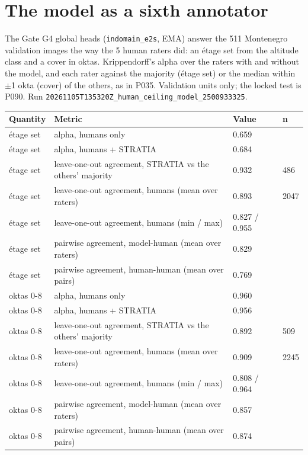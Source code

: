 \section{The model as a sixth annotator}

The Gate G4 global heads (\texttt{indomain\_\allowbreak{}e2s}, EMA) answer the 511 Montenegro validation images the way the 5 human raters did: an étage set from the altitude class and a cover in oktas. Krippendorff's alpha over the raters with and without the model, and each rater against the majority (étage set) or the median within $\pm$1 okta (cover) of the others, as in P035. Validation units only; the locked test is P090. Run \texttt{20261105T135320Z\_\allowbreak{}human\_\allowbreak{}ceiling\_\allowbreak{}model\_\allowbreak{}2500933325}.

\begin{center}{\scriptsize\setlength{\tabcolsep}{3pt}
\begin{tabular}{lp{13.5cm}ll}
\toprule
Quantity & Metric & Value & n \\
\midrule
étage set & alpha, humans only & 0.659 &  \\
étage set & alpha, humans + STRATIA & 0.684 &  \\
étage set & leave-one-out agreement, STRATIA vs the others' majority & 0.932 & 486 \\
étage set & leave-one-out agreement, humans (mean over raters) & 0.893 & 2047 \\
étage set & leave-one-out agreement, humans (min / max) & 0.827 / 0.955 &  \\
étage set & pairwise agreement, model-human (mean over raters) & 0.829 &  \\
étage set & pairwise agreement, human-human (mean over pairs) & 0.769 &  \\
oktas 0-8 & alpha, humans only & 0.960 &  \\
oktas 0-8 & alpha, humans + STRATIA & 0.956 &  \\
oktas 0-8 & leave-one-out agreement, STRATIA vs the others' majority & 0.892 & 509 \\
oktas 0-8 & leave-one-out agreement, humans (mean over raters) & 0.909 & 2245 \\
oktas 0-8 & leave-one-out agreement, humans (min / max) & 0.808 / 0.964 &  \\
oktas 0-8 & pairwise agreement, model-human (mean over raters) & 0.857 &  \\
oktas 0-8 & pairwise agreement, human-human (mean over pairs) & 0.874 &  \\
\bottomrule
\end{tabular}}
\end{center}

